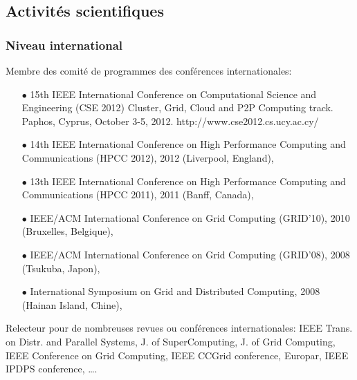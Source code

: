 \documentclass[11pt]{article}
\begin{document}
\newpage
\subsectionfont{\sectionrule{3ex}{0pt}{-1ex}{1pt}}



\subsection{Activités scientifiques}

\subsubsection{Niveau international}
Membre des comité de programmes des conférences internationales:\\[-3mm]
\begin{itemize}
\item[$\bullet$]
15th IEEE International Conference on Computational Science and Engineering (CSE 2012) 
Cluster, Grid, Cloud and P2P Computing track. Paphos, Cyprus, October 3-5, 2012. 
http://www.cse2012.cs.ucy.ac.cy/

\item[$\bullet$] 
14th IEEE International Conference on High Performance Computing and Communications (HPCC 2012), 
2012 (Liverpool, England),
\item[$\bullet$] 
13th IEEE International Conference on High Performance Computing and Communications (HPCC 2011), 
2011 (Banff, Canada),
\item[$\bullet$] 
IEEE/ACM International Conference on Grid Computing (GRID'10), 2010 (Bruxelles, Belgique),
\item[$\bullet$] 
IEEE/ACM International Conference on Grid Computing (GRID'08), 2008 (Tsukuba, Japon), 
\item [$\bullet$]
International Symposium on Grid and Distributed Computing, 2008 (Hainan Island, Chine),\\
\end{itemize}

Relecteur pour de nombreuses revues ou conférences internationales: IEEE Trans. on Distr. and Parallel Systems, 
J. of SuperComputing, J. of Grid Computing, IEEE Conference on Grid Computing, IEEE CCGrid conference, Europar,
IEEE IPDPS conference, \ldots.
\end{document}
